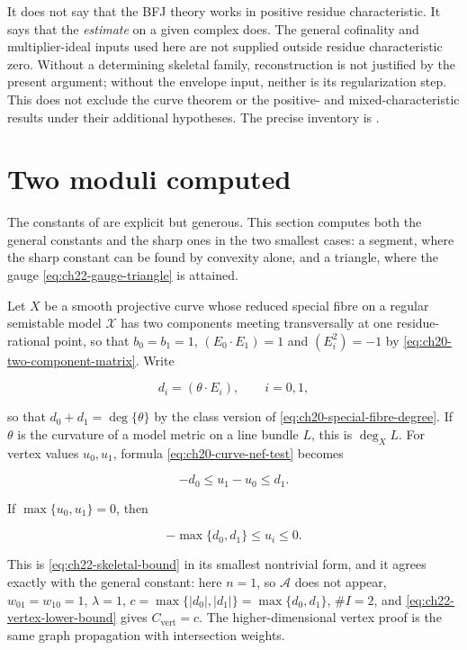 \begin{remark}
\label{rem:ch22-characteristic-free-caveat}
It does not say that the BFJ theory works in positive residue
characteristic.  It says that the \emph{estimate} on a given complex does.
The general cofinality and multiplier-ideal inputs used here are not
supplied outside residue characteristic zero.  Without a determining
skeletal family, reconstruction is not justified by the present argument;
without the envelope input, neither is its regularization step.  This does
not exclude the curve theorem or the positive- and mixed-characteristic
results under their additional hypotheses.  The precise inventory is
.
\end{remark}

\section{Two moduli computed}
\label{sec:ch22-worked-moduli}

The constants of 
are explicit but generous.  This section computes both the general constants
and the sharp ones in the two smallest cases: a segment, where the sharp
constant can be found by convexity alone, and a triangle, where the gauge
\eqref{eq:ch22-gauge-triangle} is attained.

\begin{example}
\label{ex:ch22-two-vertex}
Let $X$ be a smooth projective curve whose reduced special fibre on a
regular semistable model $\mathcal X$ has two components meeting
transversally at one residue-rational point, so that $b_0=b_1=1$,
$(E_0\cdot E_1)=1$ and
$(E_i^2)=-1$ by \eqref{eq:ch20-two-component-matrix}.  Write

\[
              d_i=(\theta\cdot E_i),\qquad i=0,1,
\]

so that $d_0+d_1=\deg\{\theta\}$ by the class version of
\eqref{eq:ch20-special-fibre-degree}.  If $\theta$ is the curvature of
a model metric on a line bundle $L$, this is $\deg_XL$.  For
vertex values $u_0,u_1$, formula
\eqref{eq:ch20-curve-nef-test} becomes

\[
                   -d_0\leq u_1-u_0\leq d_1.
\tag{22.55}\label{eq:ch22-two-vertex-bound}
\]

If $\max\{u_0,u_1\}=0$, then

\[
                   -\max\{d_0,d_1\}\leq u_i\leq0.
\]

This is \eqref{eq:ch22-skeletal-bound} in its smallest nontrivial form, and
it agrees exactly with the general constant: here $n=1$, so
$\mathcal A$ does not appear, $w_{01}=w_{10}=1$, $\lambda=1$,
$c=\max\{|d_0|,|d_1|\}=\max\{d_0,d_1\}$, $\#I=2$, and
\eqref{eq:ch22-vertex-lower-bound} gives
$C_{\mathrm{vert}}=c$.  The higher-dimensional vertex proof is the same
graph propagation with intersection weights.
\end{example}

